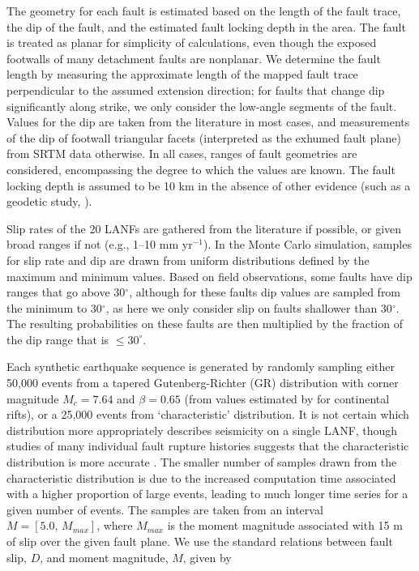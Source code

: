 \documentclass[draft,grl]{AGUTeX}
\begin{document}
\begin{article}
The geometry for each fault is estimated based on the length of the fault
trace, the dip of the fault, and the estimated fault locking depth in the area.
The fault is treated as planar for simplicity of calculations, even though the
exposed footwalls of many detachment faults are nonplanar.  We determine the
fault length by measuring the approximate length of the mapped fault trace
perpendicular to the assumed extension direction; for faults that change dip
significantly along strike, we only consider the low-angle segments of the
fault.  Values for the dip are taken from the literature in most cases, and
measurements of the dip of footwall triangular facets (interpreted as the
exhumed fault plane) from SRTM data otherwise. In all cases, ranges of fault
geometries are considered, encompassing the degree to which the values are
known. The fault locking depth is assumed to be 10 km in the absence of other
evidence (such as a geodetic study, \citep[e.g.,][]{hreinsdottir2009altotib}).

Slip rates of the 20 LANFs are gathered from the literature if possible, or
given broad ranges if not (e.g., 1--10 mm yr$^{-1}$).  In the Monte Carlo
simulation, samples for slip rate and dip are drawn from uniform distributions
defined by the maximum and minimum values.  Based on field observations, some
faults have dip ranges that go above 30$^\circ$, although for these faults dip
values are sampled from the minimum to 30$^\circ$, as here we only consider
slip on faults shallower than 30$^\circ$. The resulting probabilities on these
faults are then multiplied by the fraction of the dip range that is
$\le30^\circ$.

Each synthetic earthquake sequence is generated by randomly sampling either
50,000 events from a tapered Gutenberg-Richter (GR) distribution with corner
magnitude $M_c = 7.64$ and $\beta = 0.65$ (from values estimated by
\citet{birdkagan2004f_m} for continental rifts), or a 25,000 events from
`characteristic' distribution. It is not certain which distribution more
appropriately describes seismicity on a single LANF, though studies of many
individual fault rupture histories suggests that the characteristic
distribution is more accurate \citep[e.g.,]{hecker2013eqdist}.  The smaller
number of samples drawn from the characteristic distribution is due to the
increased computation time associated with a higher proportion of large events,
leading to much longer time series for a given number of events.  The samples
are taken from an interval $M = [5.0, \, M_{max}]$, where $M_{max}$ is the
moment magnitude associated with 15 m of slip over the given fault plane.  We
use the standard relations between fault slip, $D$, and moment magnitude, $M$,
given by


\end{article}
\end{document}
